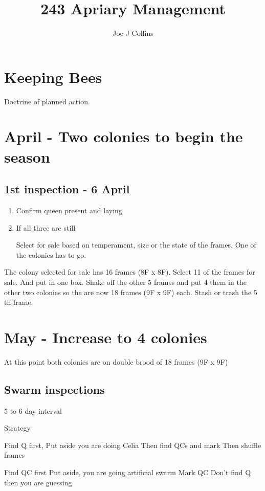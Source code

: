 \documentclass[12pt, a4paper, twoside, british]{article}
\title{243 Apriary Management}
\author{Joe J Collins}
\date{\DTMnow}
\begin{document}
 
\maketitle

\section{Keeping Bees}

Doctrine of planned action.
 
\section{April - Two colonies to begin the season}

\subsection{1st inspection - 6 April}

\begin{enumerate}
	\item{Confirm queen present and laying}
	\item{If all three are still 
	
	Select for sale based on temperament, size or the state of the frames.
	One of the colonies has to go.}
\end{enumerate}

The colony selected for sale has 16 frames (8F x 8F).
Select 11 of the frames for sale.
And put in one box.
Shake off the other 5 frames and put 4 them in the other two colonies so the are now 18 frames (9F x 9F) each.
Stash or trash the 5 th frame.

\section{May - Increase to 4 colonies}

At this point both colonies are on double brood of 18 frames (9F x 9F)

\subsection{Swarm inspections}

5 to 6 day interval

Strategy

Find Q first,
Put aside you are doing Celia
Then find QCs and mark
Then shuffle frames

Find QC first
Put aside, you are going artificial swarm
Mark QC
Don’t find Q then you are guessing
 
\end{document}
